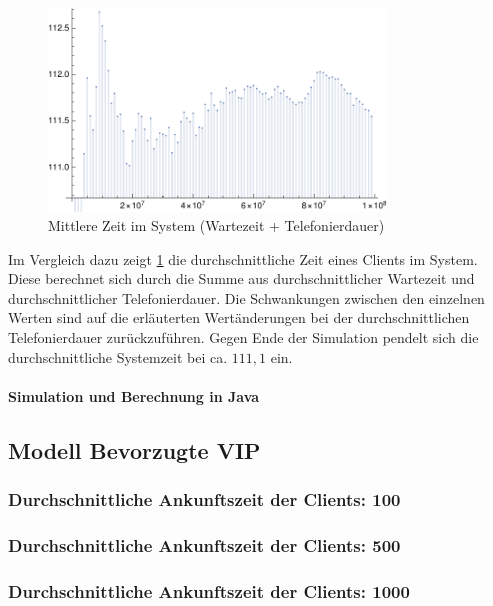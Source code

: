 \begin{figure}[htpb]
	\centering
	\includegraphics[width=0.8\textwidth]{abbildungen/auswertung100/meanSystemTimePlot.pdf}
	\caption{Mittlere Zeit im System (Wartezeit + Telefonierdauer)}
	\label{fig:meanSystemTime100}
\end{figure}

Im Vergleich dazu zeigt \ref{fig:meanSystemTime100} die durchschnittliche Zeit eines Clients im System. Diese berechnet sich durch die Summe aus durchschnittlicher Wartezeit und durchschnittlicher Telefonierdauer. Die Schwankungen zwischen den einzelnen Werten sind auf die erläuterten Wertänderungen bei der durchschnittlichen Telefonierdauer zurückzuführen. Gegen Ende der Simulation pendelt sich die durchschnittliche Systemzeit bei ca. $111,1$ ein.
  
\paragraph{Simulation und Berechnung in Java}




\subsection{Modell \glqq Bevorzugte VIP\grqq} 
\subsubsection{Durchschnittliche Ankunftszeit der Clients: 100}
\subsubsection{Durchschnittliche Ankunftszeit der Clients: 500}
\subsubsection{Durchschnittliche Ankunftszeit der Clients: 1000}
